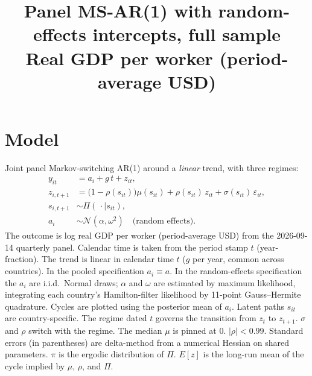 \documentclass[11pt]{article}
\title{Panel MS-AR(1) with random-effects intercepts, full sample\\[0.4em]\large Real GDP per worker (period-average USD)}
\author{}
\date{}
\begin{document}
\maketitle
\section{Model}
Joint panel Markov-switching AR(1) around a \emph{linear} trend, with three regimes:
\begin{align}
y_{it} &= a_i + g\, t + z_{it}, \\
z_{i,t+1} &= \bigl(1-\rho(s_{it})\bigr)\mu(s_{it}) + \rho(s_{it})\, z_{it} + \sigma(s_{it})\,\varepsilon_{it}, \\
s_{i,t+1} &\sim \Pi(\,\cdot\mid s_{it}), \\
a_i &\sim \mathcal{N}(\alpha,\omega^2) \quad \text{(random effects)}.
\end{align}
The outcome is log real GDP per worker (period-average USD) from the 2026-09-14 quarterly panel. Calendar time is taken from the period stamp $t$ (year-fraction). The trend is linear in calendar time $t$ ($g$ per year, common across countries). In the pooled specification $a_i\equiv a$. In the random-effects specification the $a_i$ are i.i.d.\ Normal draws; $\alpha$ and $\omega$ are estimated by maximum likelihood, integrating each country's Hamilton-filter likelihood by 11-point Gauss--Hermite quadrature. Cycles are plotted using the posterior mean of $a_i$. Latent paths $s_{it}$ are country-specific. The regime dated $t$ governs the transition from $z_t$ to $z_{t+1}$. $\sigma$ and $\rho$ switch with the regime. The median $\mu$ is pinned at 0. $|\rho|<0.99$.
Standard errors (in parentheses) are delta-method from a numerical Hessian on shared parameters. $\pi$ is the ergodic distribution of $\Pi$. $E[z]$ is the long-run mean of the cycle implied by $\mu$, $\rho$, and $\Pi$.
\clearpage
\end{document}
